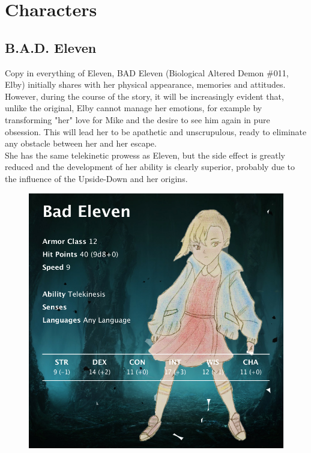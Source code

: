\section{Characters}

\subsection{B.A.D. Eleven}
Copy in everything of Eleven, BAD Eleven (Biological Altered Demon \#011, Elby) initially shares with her physical appearance, memories and attitudes.
However, during the course of the story, it will be increasingly evident that, unlike the original, Elby cannot manage her emotions, for example by transforming "her" love for Mike and the desire to see him again in pure obsession. This will lead her to be apathetic and unscrupulous, ready to eliminate any obstacle between her and her escape.\\
She has the same telekinetic prowess as Eleven, but the side effect is greatly reduced and the development of her ability is clearly superior, probably due to the influence of the Upside-Down and her origins.

\vspace*{0.5cm}

\begin{figure}[H]
	\centering
	\includegraphics[width=0.95\linewidth]{images/visual_stats/badeleven.png}
\end{figure}

